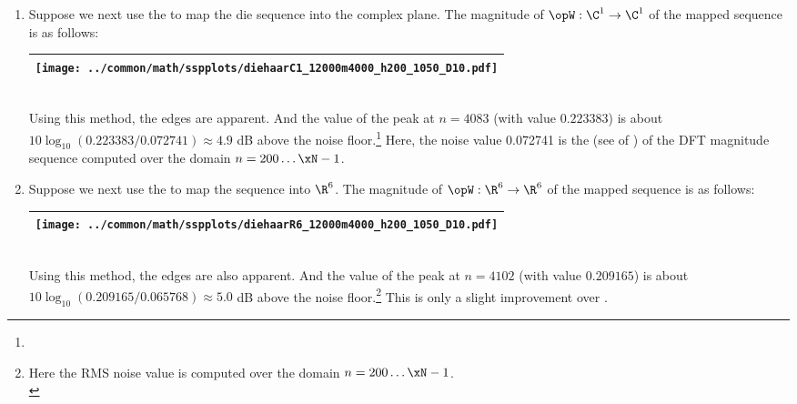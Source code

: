 \begin{example}
\begin{enumerate}
  \item \label{item:nonstat48_C1qpsk}
    Suppose we next use the   to map
    the die sequence into the complex plane.
    The magnitude of $\opW:\C^1\to\C^1$ of the mapped sequence is as follows:
    \\\begin{tabular}{|>{\scs}c|}
         \hline
         \texttt{[image: ../common/math/sspplots/diehaarC1\_12000m4000\_h200\_1050\_D10.pdf]}%
       \\\hline
    \end{tabular}\\
     Using this method, the edges are apparent.   
     And the value of the peak at $n=4083$ (with value $0.223383$) is about
     $10\log_{10}(0.223383/0.072741)\approx4.9$ dB above the noise 
     floor.\footnote{} 
    Here, the noise value 0.072741 is the  (see  of )
    of the DFT magnitude sequence computed over the domain $n=200\ldots\xN-1$.

     
  \item \label{item:nonstat48_R4}
    Suppose we next use the   to map
    the sequence into $\R^6$.
    The magnitude of $\opW:\R^6\to\R^6$ of the mapped sequence is as follows:
     \\\begin{tabular}{|>{\scs}c|}
          \hline
          \texttt{[image: ../common/math/sspplots/diehaarR6\_12000m4000\_h200\_1050\_D10.pdf]}%
        \\\hline
     \end{tabular}\\
     Using this method, the edges are also apparent.
     And the value of the peak at $n=4102$ (with value $0.209165$) is about 
     $10\log_{10}(0.209165/0.065768)\approx5.0$ dB above the noise 
     floor.\footnote{Here the RMS noise value is computed over the domain $n=200\ldots\xN-1$.\\ 
       } 
     This is only a slight improvement over .

\end{enumerate}
\end{example}


